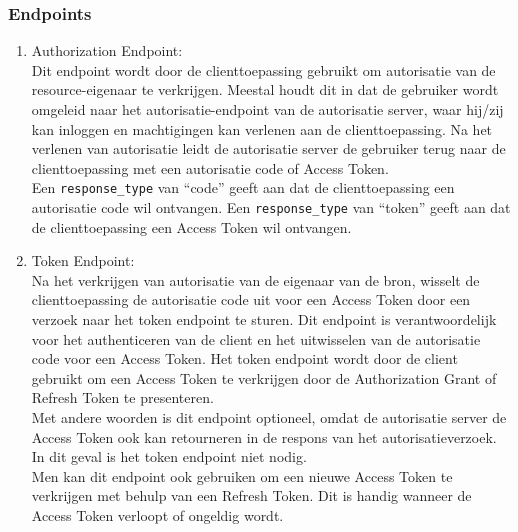 \subsubsection{Endpoints}%
\label{subsubsec:endpoints}
\begin{enumerate}[label=\textbf{-}]
    \item Authorization Endpoint: \\
    Dit endpoint wordt door de clienttoepassing gebruikt om autorisatie van de resource-eigenaar te verkrijgen. Meestal houdt dit in dat de gebruiker wordt omgeleid naar het autorisatie-endpoint van de autorisatie server, waar hij/zij kan inloggen en machtigingen kan verlenen aan de clienttoepassing. Na het verlenen van autorisatie leidt de autorisatie server de gebruiker terug naar de clienttoepassing met een autorisatie code of Access Token.
    \\
    Een \texttt{response\_type} van ``code'' geeft aan dat de clienttoepassing een autorisatie code wil ontvangen. Een \texttt{response\_type} van ``token'' geeft aan dat de clienttoepassing een Access Token wil ontvangen.
  
    \item Token Endpoint: \\
    Na het verkrijgen van autorisatie van de eigenaar van de bron, wisselt de clienttoepassing de autorisatie code uit voor een Access Token door een verzoek naar het token endpoint te sturen. Dit endpoint is verantwoordelijk voor het authenticeren van de client en het uitwisselen van de autorisatie code voor een Access Token. Het token endpoint wordt door de client gebruikt om een Access Token te verkrijgen door de Authorization Grant of Refresh Token te presenteren.
    \\
    Met andere woorden is dit endpoint optioneel, omdat de autorisatie server de Access Token ook kan retourneren in de respons van het autorisatieverzoek. In dit geval is het token endpoint niet nodig.
    \\
    Men kan dit endpoint ook gebruiken om een nieuwe Access Token te verkrijgen met behulp van een Refresh Token. Dit is handig wanneer de Access Token verloopt of ongeldig wordt.
  

\end{enumerate}
